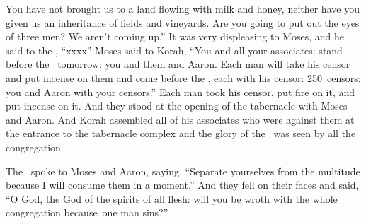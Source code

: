 \begin{inparaenum}
   You have not brought us to a land flowing with milk and honey, neither have you given us an inheritance of fields and vineyards. Are you going to put out the eyes of three men? We aren't coming up.''%
   It was very displeasing to Moses, and he said to the \lord, ``xxxx''%
   Moses said to Korah, ``You and all your associates: stand before the \lord\ tomorrow: you and them and Aaron.%
   Each man will take his censor and put incense on them and come before the \lord, each with his censor: 250~censors: you and Aaron with your censors.''%
   Each man took his censor, put fire on it, and put incense on it. And they stood at the opening of the tabernacle with Moses and Aaron.%
   And Korah assembled all of his associates who were against them at the entrance to the tabernacle complex and the glory of the \lord\ was seen by all the congregation.%
  
   The \lord\ spoke to Moses and Aaron, saying,%
   ``Separate yourselves from the multitude because I will consume them in a moment.''%
   And they fell on their faces and said, ``O God, the God of the spirits of all flesh: will you be wroth with the whole congregation because\understood\ one man sins?''%
  

\end{inparaenum}
